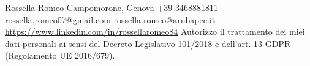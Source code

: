\documentclass[withoutsidebar]{simple-hipster}
\newlength{\rightcolwidth}
\begin{document}
\begin{paracol}{2}
\vfill{} %

\setlength{\parindent}{0pt}
\begin{minipage}[t]{\rightcolwidth}
\begin{center}\fontfamily{\sfdefault}\selectfont \color{black!70}
{
  \footnotesize Rossella Romeo
   Campomorone, Genova
   +39 3468881811
  \newline
   \protect\url{rossella.romeo07@gmail.com}
   \protect\url{rossella.romeo@arubapec.it}
  \newline
   \protect\url{https://www.linkedin.com/in/rossellaromeo84}
  \newline
  \newline
  \tiny{Autorizzo il trattamento dei miei dati personali ai sensi del Decreto Legislativo 101/2018 e dell'art. 13 GDPR (Regolamento UE 2016/679).}
}
\end{center}
\end{minipage}

\end{paracol}
\end{document}
